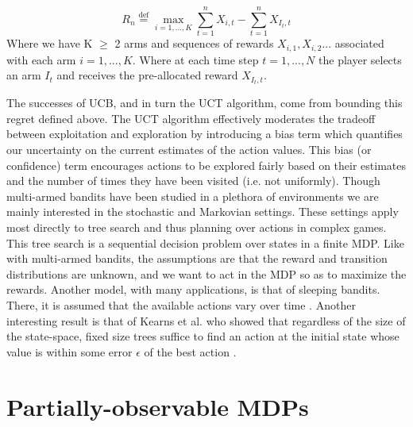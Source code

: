 \documentclass[msc, ai, logo, twoside, notimes, parskip, leftchapter, normalheadings]{infthesis}
\newcommand*{\defeq}{\stackrel{\text{def}}{=}}
\begin{document}
\begin{equation}
R_n \defeq \max_{i=1,...,K} \sum_{t=1}^n X_{i,t} - \sum_{t=1}^n X_{I_t,t}
\end{equation}
Where we have K \(\geq\) 2 arms and sequences of rewards \(X_{i,1},X_{i,2}...\) associated with each arm \( i = 1,...,K\). Where at each time step \( t=1,...,N\) the player selects an arm \(I_t\) and receives the pre-allocated reward \(X_{I_t,t}\).

The successes of UCB, and in turn the UCT algorithm, come from bounding this regret defined above. The UCT algorithm effectively moderates the tradeoff between exploitation and exploration by introducing a bias term which quantifies our uncertainty on the current estimates of the action values. This bias (or confidence) term encourages actions to be explored fairly based on their estimates and the number of times they have been visited (i.e. not uniformly).
Though multi-armed bandits have been studied in a plethora of environments we are mainly interested in the stochastic and Markovian settings. These settings apply most directly to tree search and thus planning over actions in complex games. This tree search is a sequential decision problem over states in a finite MDP. Like with multi-armed bandits, the assumptions are that the reward and transition distributions are unknown, and we want to act in the MDP so as to maximize the rewards. Another model, with many applications, is that of sleeping bandits. There, it is assumed that the available actions vary over time \citep{regretAnalysis}. Another interesting result is that of Kearns et al. who showed that regardless of the size of the state-space, fixed size trees suffice to find an action at the initial state whose value is within some error \(\epsilon\) of the best action \citep{Kearns2002}.

\section{Partially-observable MDPs}
\end{document}
